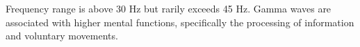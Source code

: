\documentclass[12pt, a4paper, fleqn]{memoir}%
\begin{document}
 Frequency range is above 30 Hz but rarily exceeds 45 Hz. Gamma waves are associated with higher mental functions, specifically the processing of information and voluntary movements.
\end{document}
